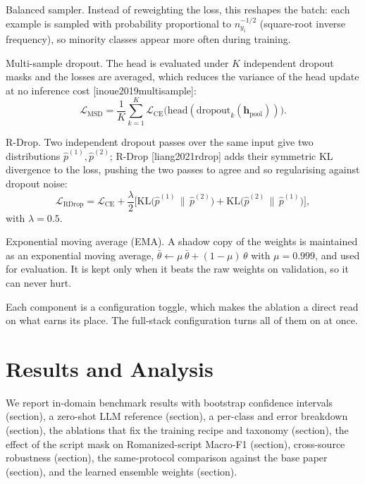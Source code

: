 \documentclass[11pt,a4paper]{article}
\def\citep#1{[#1]}%
\def\cref#1{section}%
\def\emph#1{#1}%
\begin{document}
\emph{Balanced sampler.} Instead of reweighting the loss, this reshapes the batch: each example is sampled with probability proportional to $n_{y_i}^{-1/2}$ (square-root inverse frequency), so minority classes appear more often during training.

\emph{Multi-sample dropout.} The head is evaluated under $K$ independent dropout masks and the losses are averaged, which reduces the variance of the head update at no inference cost \citep{inoue2019multisample}:
\begin{equation}
\mathcal{L}_{\mathrm{MSD}} = \frac{1}{K}\sum_{k=1}^{K} \mathcal{L}_{\mathrm{CE}}\!\big(\mathrm{head}(\mathrm{dropout}_k(\mathbf{h}_{\mathrm{pool}}))\big).
\label{eq:msd}
\end{equation}

\emph{R-Drop.} Two independent dropout passes over the same input give two distributions $\hat{p}^{(1)}, \hat{p}^{(2)}$; R-Drop \citep{liang2021rdrop} adds their symmetric KL divergence to the loss, pushing the two passes to agree and so regularising against dropout noise:
\begin{equation}
\mathcal{L}_{\mathrm{RDrop}} = \mathcal{L}_{\mathrm{CE}} + \frac{\lambda}{2}\Big[\mathrm{KL}\big(\hat{p}^{(1)} \,\|\, \hat{p}^{(2)}\big) + \mathrm{KL}\big(\hat{p}^{(2)} \,\|\, \hat{p}^{(1)}\big)\Big],
\label{eq:rdrop}
\end{equation}
with $\lambda = 0.5$.

\emph{Exponential moving average (EMA).} A shadow copy of the weights is maintained as an exponential moving average, $\bar{\theta} \leftarrow \mu\,\bar{\theta} + (1-\mu)\,\theta$ with $\mu = 0.999$, and used for evaluation. It is kept only when it beats the raw weights on validation, so it can never hurt.

Each component is a configuration toggle, which makes the ablation a direct read on what earns its place. The full-stack configuration turns all of them on at once.


\section{Results and Analysis}
\label{sec:results}

We report in-domain benchmark results with bootstrap confidence intervals (\cref{sec:main-results}), a zero-shot LLM reference (\cref{sec:llm-baseline}), a per-class and error breakdown (\cref{sec:perclass-results}), the ablations that fix the training recipe and taxonomy (\cref{sec:ablation-results}), the effect of the script mask on Romanized-script Macro-F1 (\cref{sec:scriptmask-results}), cross-source robustness (\cref{sec:robustness-results}), the same-protocol comparison against the base paper (\cref{sec:basepaper-results}), and the learned ensemble weights (\cref{sec:ensemble-results}).
\end{document}
